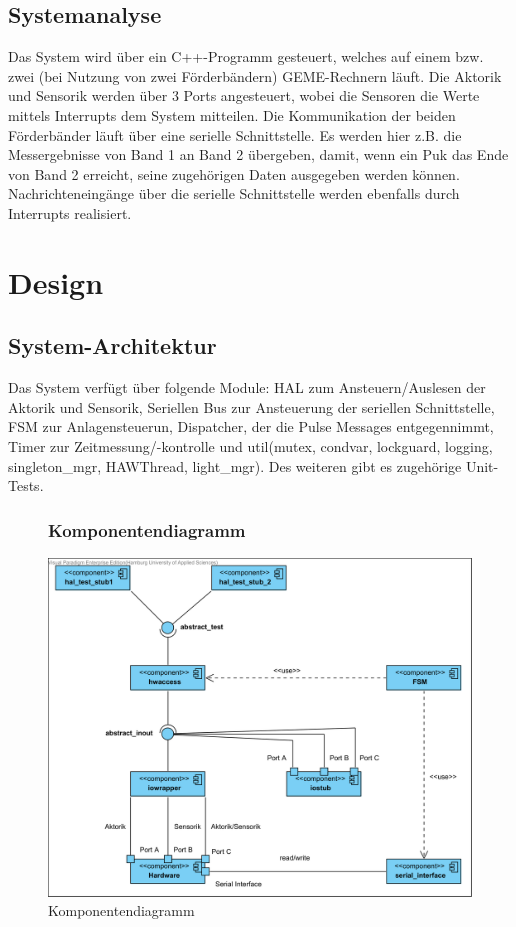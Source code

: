 \documentclass[oneside,a4paper,titlepage]{scrartcl} %
\begin{document}
\newpage

\subsection{Systemanalyse}
Das System wird über ein C++-Programm gesteuert, welches auf einem bzw. zwei (bei Nutzung von zwei Förderbändern) GEME-Rechnern läuft. Die Aktorik und Sensorik werden über 3 Ports angesteuert, wobei die Sensoren die Werte mittels Interrupts dem System mitteilen.\newline
Die Kommunikation der beiden Förderbänder läuft über eine serielle Schnittstelle. Es werden hier z.B. die Messergebnisse von Band 1 an Band 2 übergeben, damit, wenn ein Puk das Ende von Band 2 erreicht, seine zugehörigen Daten ausgegeben werden können. Nachrichteneingänge über die serielle Schnittstelle werden ebenfalls durch Interrupts realisiert.\newline
\newpage

\section{Design}

\subsection{System-Architektur}
Das System verfügt über folgende Module: HAL zum Ansteuern/Auslesen der Aktorik und Sensorik, Seriellen Bus zur Ansteuerung der seriellen Schnittstelle, FSM zur Anlagensteuerun, Dispatcher, der die Pulse Messages entgegennimmt, Timer zur Zeitmessung/-kontrolle und util(mutex, condvar, lockguard, logging, singleton\_mgr, HAWThread, light\_mgr). Des weiteren gibt es zugehörige Unit-Tests.\newpage

\begin{figure}
    \subsubsection{Komponentendiagramm}
    \centering\vfill\includegraphics[angle=0,scale=0.8]{imgs/Sortieranlage-Komponenten.png}
    \caption{Komponentendiagramm}
\end{figure}
\end{document}
